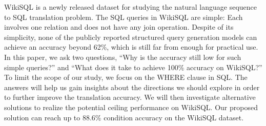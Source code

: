 WikiSQL is a newly released dataset for studying the natural language sequence to SQL translation problem.  The SQL queries in WikiSQL are simple: Each involves one relation and does not have any join operation. Despite of its simplicity, none of the publicly reported structured query generation models can achieve an accuracy beyond 62\%, which is still far from enough for practical use. In this paper, we ask two questions, ``Why is the accuracy still low for such simple queries?'' and ``What does it take to achieve 100\% accuracy on WikiSQL?'' To limit the scope of our study, we focus on the WHERE clause in SQL. The answers will help us gain insights about the directions we should explore in order to further improve the translation accuracy. We will then investigate alternative solutions to realize the potential ceiling performance on WikiSQL. Our proposed solution can reach up to 88.6\% condition accuracy on the WikiSQL dataset.
